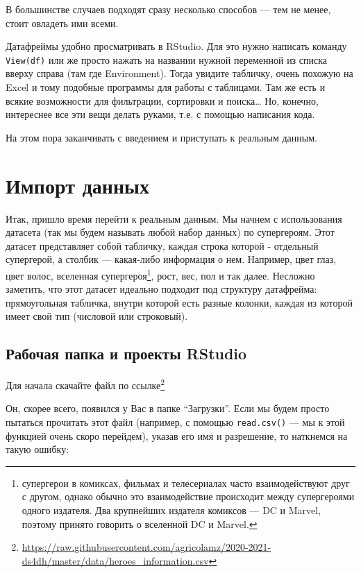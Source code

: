 \documentclass[
]{book}
\renewcommand{\href}[2]{#2\footnote{\url{#1}}}
\begin{document}
В большинстве случаев подходят сразу несколько способов --- тем не менее, стоит овладеть ими всеми.

Датафреймы удобно просматривать в RStudio. Для это нужно написать команду \texttt{View(df)} или же просто нажать на названии нужной переменной из списка вверху справа (там где Environment). Тогда увидите табличку, очень похожую на Excel и тому подобные программы для работы с таблицами. Там же есть и всякие возможности для фильтрации, сортировки и поиска\ldots{} Но, конечно, интереснее все эти вещи делать руками, т.е. с помощью написания кода.

На этом пора заканчивать с введением и приступать к реальным данным.

\hypertarget{real_data}{%
\chapter{Импорт данных}\label{real_data}}

Итак, пришло время перейти к реальным данным. Мы начнем с использования датасета (так мы будем называть любой набор данных) по супергероям. Этот датасет представляет собой табличку, каждая строка которой - отдельный супергерой, а столбик --- какая-либо информация о нем. Например, цвет глаз, цвет волос, вселенная супергероя\footnote{супергерои в комиксах, фильмах и телесериалах часто взаимодействуют друг с другом, однако обычно это взаимодействие происходит между супергероями одного издателя. Два крупнейших издателя комиксов --- DC и Marvel, поэтому принято говорить о вселенной DC и Marvel.}, рост, вес, пол и так далее. Несложно заметить, что этот датасет идеально подходит под структуру датафрейма: прямоугольная табличка, внутри которой есть разные колонки, каждая из которой имеет свой тип (числовой или строковый).

\hypertarget{wd}{%
\section{Рабочая папка и проекты RStudio}\label{wd}}

Для начала скачайте файл по \href{https://raw.githubusercontent.com/agricolamz/2020-2021-ds4dh/master/data/heroes_information.csv}{ссылке}

Он, скорее всего, появился у Вас в папке ``Загрузки''. Если мы будем просто пытаться прочитать этот файл (например, с помощью \texttt{read.csv()} --- мы к этой функцией очень скоро перейдем), указав его имя и разрешение, то наткнемся на такую ошибку:
\end{document}
